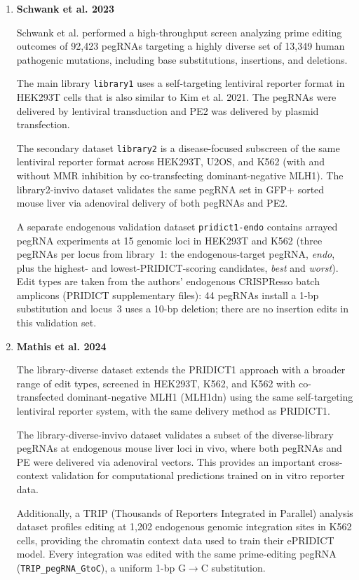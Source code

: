 \documentclass{article}
\begin{document}
\begin{enumerate}
    \item \textbf{Schwank et al. 2023}

    Schwank et al.\cite{schwankgeraldPredictingPrimeEditing2023} performed a high-throughput screen analyzing prime editing outcomes of 92,423 pegRNAs targeting a highly diverse set of 13,349 human pathogenic mutations, including base substitutions, insertions, and deletions.

    The main library \nolinkurl{library1} uses a self-targeting lentiviral reporter format in HEK293T cells that is also similar to Kim et al. 2021. The pegRNAs were delivered by lentiviral transduction and PE2 was delivered by plasmid transfection.

    The secondary dataset \nolinkurl{library2} is a disease-focused subscreen of the same lentiviral reporter format across HEK293T, U2OS, and K562 (with and without MMR inhibition by co-transfecting dominant-negative MLH1). The library2-invivo dataset validates the same pegRNA set in GFP+ sorted mouse liver via adenoviral delivery of both pegRNAs and PE2.

    A separate endogenous validation dataset \nolinkurl{pridict1-endo} contains arrayed pegRNA experiments at 15 genomic loci in HEK293T and K562 (three pegRNAs per locus from library~1: the endogenous-target pegRNA, \emph{endo}, plus the highest- and lowest-PRIDICT-scoring candidates, \emph{best} and \emph{worst}). Edit types are taken from the authors' endogenous CRISPResso batch amplicons (PRIDICT supplementary files): 44 pegRNAs install a 1-bp substitution and locus~3 uses a 10-bp deletion; there are no insertion edits in this validation set.

    \item \textbf{Mathis et al. 2024}

    The library-diverse dataset extends the PRIDICT1 approach with a broader range of edit types, screened in HEK293T, K562, and K562 with co-transfected dominant-negative MLH1 (MLH1dn) using the same self-targeting lentiviral reporter system, with the same delivery method as PRIDICT1.

    The library-diverse-invivo dataset validates a subset of the diverse-library pegRNAs at endogenous mouse liver loci in vivo, where both pegRNAs and PE were delivered via adenoviral vectors. This provides an important cross-context validation for computational predictions trained on in vitro reporter data.

    Additionally, a TRIP (Thousands of Reporters Integrated in Parallel) analysis dataset profiles editing at 1,202 endogenous genomic integration sites in K562 cells, providing the chromatin context data used to train their ePRIDICT model. Every integration was edited with the same prime-editing pegRNA (\nolinkurl{TRIP\_pegRNA\_GtoC}), a uniform 1-bp G$\to$C substitution. 


\end{enumerate}
\end{document}
